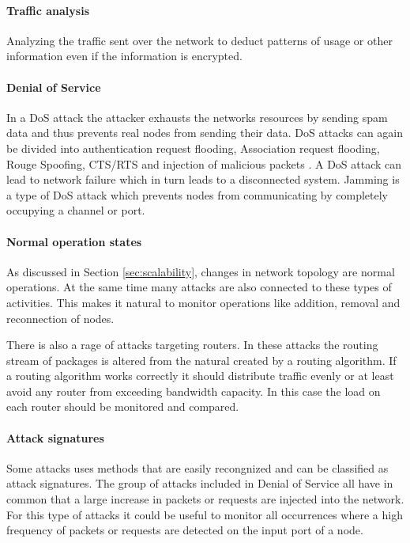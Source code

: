 \paragraph{Traffic analysis}
Analyzing the traffic sent over the network to deduct patterns of usage or other information even if the information is encrypted. 

\paragraph{Denial of Service} 
In a DoS attack the attacker exhausts the networks resources by sending spam data and thus prevents real nodes from sending their data. DoS attacks can again be divided into authentication request flooding, Association request flooding, Rouge Spoofing, CTS/RTS and injection of malicious packets \cite{intrusion_detection}. A DoS attack can lead to network failure which in turn leads to a disconnected system. Jamming is a type of DoS attack which prevents nodes from communicating by completely occupying a channel or port. 


\paragraph{Normal operation states}
As discussed in Section \ref{sec:scalability}, changes in network topology are normal operations. At the same time many attacks are also connected to these types of activities. This makes it natural to monitor operations like addition, removal and reconnection of nodes. 

There is also a rage of attacks targeting routers. In these attacks the routing stream of packages is altered from the natural created by a routing algorithm. If a routing algorithm works correctly it should distribute traffic evenly or at least avoid any router from exceeding bandwidth capacity. In this case the load on each router should be monitored and compared.

 
\paragraph{Attack signatures}
Some attacks uses methods that are easily recongnized and can be classified as attack signatures. The group of attacks included in Denial of Service all have in common that a large increase in packets or requests are injected into the network. For this type of attacks it could be useful to monitor all occurrences where a high frequency of packets or requests are detected on the input port of a node.  \\

